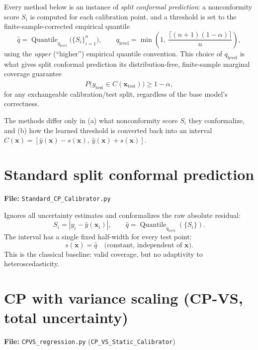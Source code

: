 \documentclass[11pt]{article}
\begin{document}
Every method below is an instance of \emph{split conformal prediction}: a nonconformity score $S_i$
is computed for each calibration point, and a threshold is set to the finite-sample-corrected
empirical quantile
\begin{equation}
\hat{q} = \operatorname{Quantile}_{q_{\mathrm{level}}}\big(\{S_i\}_{i=1}^n\big), \qquad
q_{\mathrm{level}} = \min\!\left(1,\ \frac{\lceil (n+1)(1-\alpha)\rceil}{n}\right),
\label{eq:qlevel}
\end{equation}
using the \emph{upper} (``higher'') empirical quantile convention. This choice of
$q_{\mathrm{level}}$ is what gives split conformal prediction its distribution-free, finite-sample
marginal coverage guarantee
\begin{equation}
P\big(y_{\mathrm{test}} \in \hat{C}(\bm{x}_{\mathrm{test}})\big) \ge 1-\alpha,
\end{equation}
for any exchangeable calibration/test split, regardless of the base model's correctness.

\bigskip
The methods differ only in (a) what nonconformity score $S_i$ they conformalize, and (b) how the
learned threshold is converted back into an interval $\hat{C}(\bm{x}) = [\hat{y}(\bm{x}) -
s(\bm{x}),\ \hat{y}(\bm{x}) + s(\bm{x})]$.

\section{Standard split conformal prediction}
\textbf{File:} \texttt{Standard\_CP\_Calibrator.py}

Ignores all uncertainty estimates and conformalizes the raw absolute residual:
\begin{equation}
S_i = |y_i - \hat{y}(\bm{x}_i)|, \qquad \hat{q} =
\operatorname{Quantile}_{q_{\mathrm{level}}}(\{S_i\}).
\end{equation}
The interval has a single fixed half-width for every test point:
\begin{equation}
s(\bm{x}) = \hat{q} \quad \text{(constant, independent of } \bm{x}\text{)}.
\end{equation}
This is the classical baseline: valid coverage, but no adaptivity to heteroscedasticity.

\section{CP with variance scaling (CP-VS, total uncertainty)}
\textbf{File:} \texttt{CPVS\_regression.py} (\texttt{CP\_VS\_Static\_Calibrator})
\end{document}
